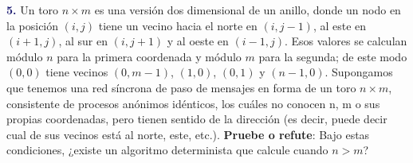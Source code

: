 \newpage
\textbf{\textcolor{MidnightBlue}{5.}} Un toro $n \times m$ es una versión
dos dimensional de un anillo, donde un nodo en la posición $(i, j)$ tiene
un vecino hacia el norte en $(i, j - 1)$, al este en $(i + 1, j)$, al sur
en $(i, j + 1)$ y al oeste en $(i - 1, j)$. Esos valores se calculan módulo
$n$ para la primera coordenada y módulo $m$ para la segunda; de este modo
$(0, 0)$ tiene vecinos $(0, m - 1)$, $(1, 0)$, $(0, 1)$ y $(n - 1, 0)$.
Supongamos que tenemos una red síncrona de paso de mensajes en forma de un
toro $n \times m$, consistente de procesos anónimos idénticos, los cuáles
no conocen n, m o sus propias coordenadas, pero tienen sentido de la dirección
(es decir, puede decir cual de sus vecinos está al norte, este, etc.).
\textbf{Pruebe o refute}: Bajo estas condiciones, ¿existe un algoritmo
determinista que calcule cuando $n > m$?
